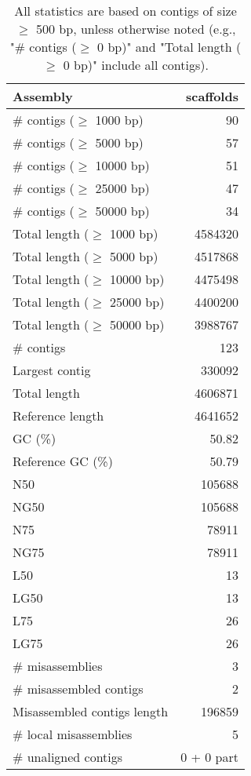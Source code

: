 \documentclass[12pt,a4paper]{article}
\begin{document}
\begin{table}[ht]
\begin{center}
\caption{All statistics are based on contigs of size $\geq$ 500 bp, unless otherwise noted (e.g., "\# contigs ($\geq$ 0 bp)" and "Total length ($\geq$ 0 bp)" include all contigs).}
\begin{tabular}{|l*{1}{|r}|}
\hline
Assembly & scaffolds \\ \hline
\# contigs ($\geq$ 1000 bp) & 90 \\ \hline
\# contigs ($\geq$ 5000 bp) & 57 \\ \hline
\# contigs ($\geq$ 10000 bp) & 51 \\ \hline
\# contigs ($\geq$ 25000 bp) & 47 \\ \hline
\# contigs ($\geq$ 50000 bp) & 34 \\ \hline
Total length ($\geq$ 1000 bp) & 4584320 \\ \hline
Total length ($\geq$ 5000 bp) & 4517868 \\ \hline
Total length ($\geq$ 10000 bp) & 4475498 \\ \hline
Total length ($\geq$ 25000 bp) & 4400200 \\ \hline
Total length ($\geq$ 50000 bp) & 3988767 \\ \hline
\# contigs & 123 \\ \hline
Largest contig & 330092 \\ \hline
Total length & 4606871 \\ \hline
Reference length & 4641652 \\ \hline
GC (\%) & 50.82 \\ \hline
Reference GC (\%) & 50.79 \\ \hline
N50 & 105688 \\ \hline
NG50 & 105688 \\ \hline
N75 & 78911 \\ \hline
NG75 & 78911 \\ \hline
L50 & 13 \\ \hline
LG50 & 13 \\ \hline
L75 & 26 \\ \hline
LG75 & 26 \\ \hline
\# misassemblies & 3 \\ \hline
\# misassembled contigs & 2 \\ \hline
Misassembled contigs length & 196859 \\ \hline
\# local misassemblies & 5 \\ \hline
\# unaligned contigs & 0 + 0 part \\ \hline

\end{tabular}
\end{center}
\end{table}
\end{document}
